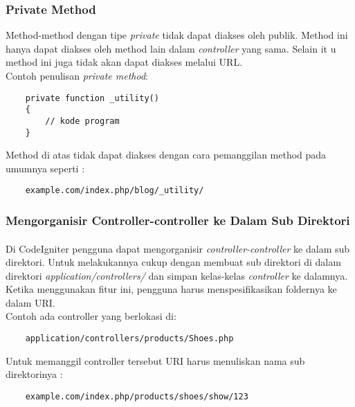 	\subsubsection{Private Method}
	Method-method dengan tipe \textit{private} tidak dapat diakses oleh publik. Method ini hanya dapat diakses oleh method lain dalam \textit{controller} yang sama. Selain it           u method ini juga tidak akan dapat diakses melalui URL.\\
Contoh penulisan \textit{private method}:
\begin{lstlisting}
	private function _utility()
	{
        // kode program
	}
\end{lstlisting}
Method di atas tidak dapat diakses dengan cara pemanggilan method pada umumnya seperti :
\begin{lstlisting}
	example.com/index.php/blog/_utility/
\end{lstlisting}

	\subsubsection{Mengorganisir Controller-controller ke Dalam Sub Direktori}
\paragraph{} Di CodeIgniter pengguna dapat mengorganisir \textit{controller-controller} ke dalam sub direktori. Untuk melakukannya cukup dengan membuat sub direktori di dalam direktori \textit{application/controllers/} dan simpan kelas-kelas \textit{controller} ke dalamnya. Ketika menggunakan fitur ini, pengguna harus menspesifikasikan foldernya ke dalam URI. \\
Contoh ada controller yang berlokasi di:
\begin{lstlisting}
	application/controllers/products/Shoes.php
 \end{lstlisting}
Untuk memanggil controller tersebut URI harus menuliskan nama sub direktorinya :
\begin{lstlisting}
	example.com/index.php/products/shoes/show/123
\end{lstlisting}

